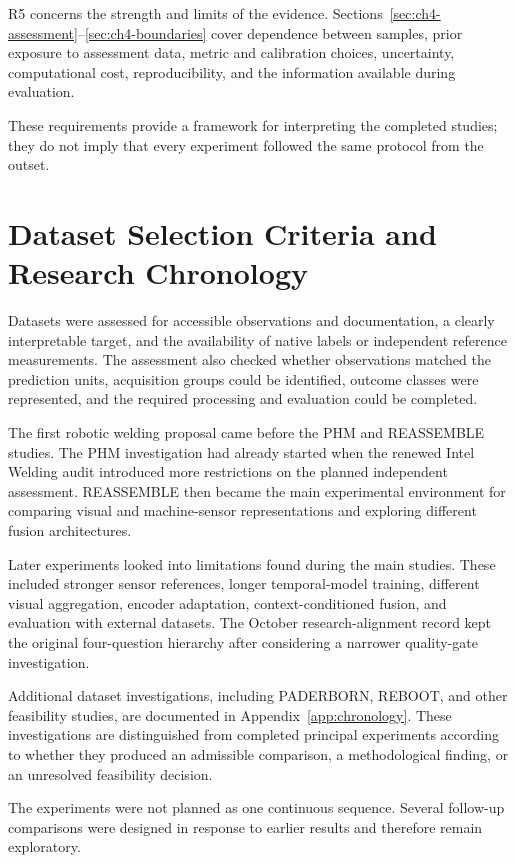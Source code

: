 R5 concerns the strength and limits of the evidence. Sections~\ref{sec:ch4-assessment}--\ref{sec:ch4-boundaries} cover dependence between samples, prior exposure to assessment data, metric and calibration choices, uncertainty, computational cost, reproducibility, and the information available during evaluation.

These requirements provide a framework for interpreting the completed studies; they do not imply that every experiment followed the same protocol from the outset.

\section{Dataset Selection Criteria and Research Chronology}
\label{sec:ch4-selection}

Datasets were assessed for accessible observations and documentation, a clearly interpretable target, and the availability of native labels or independent reference measurements. The assessment also checked whether observations matched the prediction units, acquisition groups could be identified, outcome classes were represented, and the required processing and evaluation could be completed.

The first robotic welding proposal came before the PHM and REASSEMBLE studies. The PHM investigation had already started when the renewed Intel Welding audit introduced more restrictions on the planned independent assessment. REASSEMBLE then became the main experimental environment for comparing visual and machine-sensor representations and exploring different fusion architectures.

Later experiments looked into limitations found during the main studies. These included stronger sensor references, longer temporal-model training, different visual aggregation, encoder adaptation, context-conditioned fusion, and evaluation with external datasets. The October research-alignment record kept the original four-question hierarchy after considering a narrower quality-gate investigation.

Additional dataset investigations, including PADERBORN, REBOOT, and other feasibility studies, are documented in Appendix~\ref{app:chronology}. These investigations are distinguished from completed principal experiments according to whether they produced an admissible comparison, a methodological finding, or an unresolved feasibility decision.

The experiments were not planned as one continuous sequence. Several follow-up comparisons were designed in response to earlier results and therefore remain exploratory.

